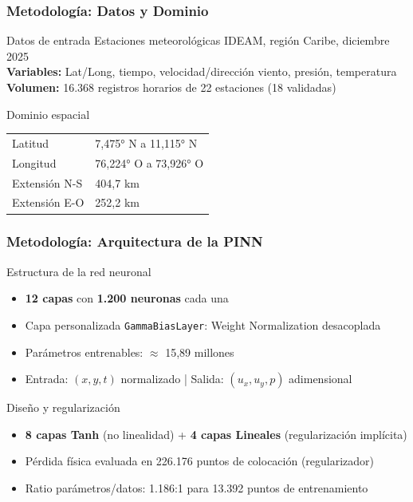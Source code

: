 \begin{frame}[fragile]
  \frametitle{Metodología: Datos y Dominio}
  
  \begin{block}{Datos de entrada}
    Estaciones meteorológicas IDEAM, región Caribe, diciembre 2025\\
    \textbf{Variables:} Lat/Long, tiempo, velocidad/dirección viento, presión, temperatura\\
    \textbf{Volumen:} 16.368 registros horarios de 22 estaciones (18 validadas)
  \end{block}
  
  \begin{block}{Dominio espacial}
    \begin{tabular}{ll}
      Latitud & 7,475° N a 11,115° N \\
      Longitud & 76,224° O a 73,926° O \\
      Extensión N-S & 404,7 km \\
      Extensión E-O & 252,2 km
    \end{tabular}
  \end{block}
  
\end{frame}

\begin{frame}[fragile]
  \frametitle{Metodología: Arquitectura de la PINN}
  
  \begin{block}{Estructura de la red neuronal}
    \begin{itemize}
      \item \textbf{12 capas} con \textbf{1.200 neuronas} cada una
      \item Capa personalizada \texttt{GammaBiasLayer}: Weight Normalization desacoplada
      \item Parámetros entrenables: $\approx$ 15,89 millones
      \item Entrada: $(x, y, t)$ normalizado | Salida: $(u_x, u_y, p)$ adimensional
    \end{itemize}
  \end{block}
  
  \begin{block}{Diseño y regularización}
    \begin{itemize}
      \item \textbf{8 capas Tanh} (no linealidad) + \textbf{4 capas Lineales} (regularización implícita)
      \item Pérdida física evaluada en 226.176 puntos de colocación (regularizador)
      \item Ratio parámetros/datos: 1.186:1 para 13.392 puntos de entrenamiento
    \end{itemize}
  \end{block}
  
\end{frame}

